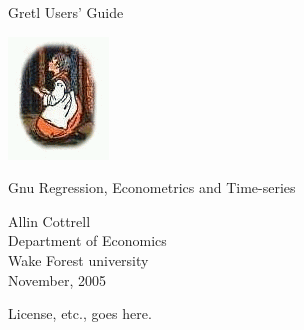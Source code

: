 \documentclass{report}
\begin{document}
\VerbatimFootnotes

\setlength{\parindent}{0pt}
\setlength{\parskip}{1ex}

\newcommand{\gtitle}[1]{\vspace*{1in}
   {\Huge \sffamily #1}\par
   \vspace{.5in}
  \includegraphics{figures/gretl-logo} 
}

\newcommand{\gsubtitle}[1]{%
   {\Large \sffamily #1}
   \vspace{.5in}
}


\thispagestyle{empty}

\begin{center}
\label{titlepage}

\gtitle{Gretl Users' Guide}

\gsubtitle{Gnu Regression, Econometrics and Time-series}

{\large \sffamily 
Allin Cottrell\\
Department of Economics\\
Wake Forest university\\
\vspace{20pt}
November, 2005}

\end{center}
\clearpage



\thispagestyle{empty}

\begin{center}
\label{license}

License, etc., goes here.

\end{center}
\clearpage



\tableofcontents

\clearpage
{}

















\appendix



\end{document}
